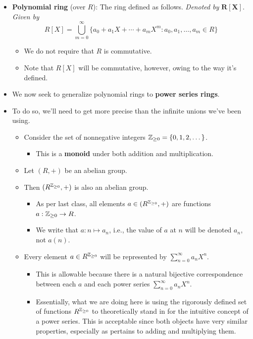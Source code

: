 \documentclass[../notes.tex]{subfiles}
\begin{document}
\begin{itemize}
\begin{itemize}
\begin{itemize}
        \end{itemize}
    \end{itemize}
    \item \textbf{Polynomial ring} (over $R$): The ring defined as follows. \emph{Denoted by} $\bm{R[X]}$. \emph{Given by}
    \begin{equation*}
        R[X] = \bigcup_{m=0}^\infty\{a_0+a_1X+\cdots+a_mX^m:a_0,a_1,\dots,a_m\in R\}
    \end{equation*}
    \begin{itemize}
        \item We do not require that $R$ is commutative.
        \item Note that $R[X]$ will be commutative, however, owing to the way it's defined.
    \end{itemize}
    \item We now seek to generalize polynomial rings to \textbf{power series rings}.
    \item To do so, we'll need to get more precise than the infinite unions we've been using.
    \begin{itemize}
        \item Consider the set of nonnegative integers ${\mathbb{Z}_{\geq 0}}=\{0,1,2,\dots\}$.
        \begin{itemize}
            \item This is a \textbf{monoid} under both addition and multiplication.
        \end{itemize}
        \item Let $(R,+)$ be an abelian group.
        \item Then $(R^{\mathbb{Z}_{\geq 0}},+)$ is also an abelian group.
        \begin{itemize}
            \item As per last class, all elements $a\in(R^{\mathbb{Z}_{\geq 0}},+)$ are functions $a:{\mathbb{Z}_{\geq 0}}\to R$.
            \item We write that $a:n\mapsto a_n$, i.e., the value of $a$ at $n$ will be denoted $a_n$, not $a(n)$.
        \end{itemize}
        \item Every element $a\in R^{\mathbb{Z}_{\geq 0}}$ will be represented by $\sum_{n=0}^\infty a_nX^n$.
        \begin{itemize}
            \item This is allowable because there is a natural bijective correspondence between each $a$ and each power series $\sum_{n=0}^\infty a_nX^n$.
            \item Essentially, what we are doing here is using the rigorously defined set of functions $R^{\mathbb{Z}_{\geq 0}}$ to theoretically stand in for the intuitive concept of a power series. This is acceptable since both objects have very similar properties, especially as pertains to adding and multiplying them.

\end{itemize}
\end{itemize}
\end{itemize}
\end{document}
